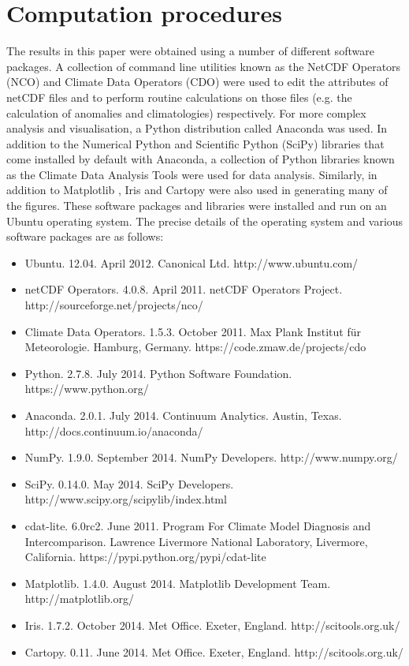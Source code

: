 \section{Computation procedures}\label{s:computation}

The results in this paper were obtained using a number of different software packages. A collection of command line utilities known as the NetCDF Operators (NCO) and Climate Data Operators (CDO) were used to edit the attributes of netCDF files and to perform routine calculations on those files (e.g. the calculation of anomalies and climatologies) respectively. For more complex analysis and visualisation, a Python distribution called Anaconda was used. In addition to the Numerical Python \citep[NumPy;][]{VanDerWalt2011} and Scientific Python (SciPy) libraries that come installed by default with Anaconda, a collection of Python libraries known as the Climate Data Analysis Tools \citep[CDAT;][]{Doutriaux2009} were used for data analysis. Similarly, in addition to Matplotlib \citep[the default Python plotting library;][]{Hunter2007}, Iris and Cartopy were also used in generating many of the figures. These software packages and libraries were installed and run on an Ubuntu operating system. The precise details of the operating system and various software packages are as follows:
\begin{itemize}
\item Ubuntu. 12.04. April 2012. Canonical Ltd. http://www.ubuntu.com/
\item netCDF Operators. 4.0.8. April 2011. netCDF Operators Project. http://sourceforge.net/projects/nco/
\item Climate Data Operators. 1.5.3. October 2011. Max Plank Institut f{\"u}r Meteorologie. Hamburg, Germany. https://code.zmaw.de/projects/cdo
\item Python. 2.7.8. July 2014. Python Software Foundation. https://www.python.org/
\item Anaconda. 2.0.1. July 2014. Continuum Analytics. Austin, Texas. http://docs.continuum.io/anaconda/
\item NumPy. 1.9.0. September 2014. NumPy Developers. http://www.numpy.org/
\item SciPy. 0.14.0. May 2014. SciPy Developers. http://www.scipy.org/scipylib/index.html
\item cdat-lite. 6.0rc2. June 2011. Program For Climate Model Diagnosis and Intercomparison. Lawrence Livermore National Laboratory, Livermore, California. https://pypi.python.org/pypi/cdat-lite
\item Matplotlib. 1.4.0. August 2014. Matplotlib Development Team. http://matplotlib.org/
\item Iris. 1.7.2. October 2014. Met Office. Exeter, England. http://scitools.org.uk/
\item Cartopy. 0.11. June 2014. Met Office. Exeter, England. http://scitools.org.uk/
\end{itemize}

